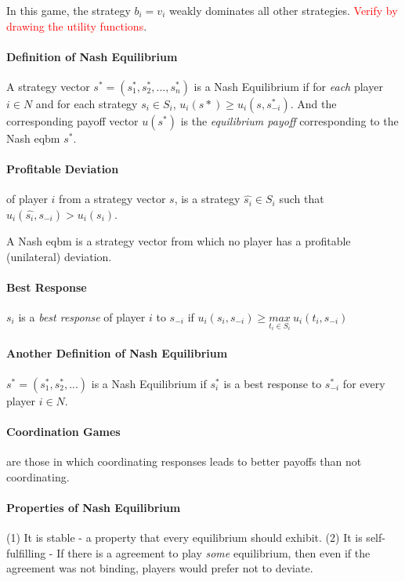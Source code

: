 In this game, the strategy $b_i = v_i$ weakly dominates all other strategies. \textcolor{red}{Verify by drawing the utility functions}.

\paragraph{Definition of Nash Equilibrium} A strategy vector $s^* = (s_1^*, s_2^*, ..., s_n^*)$ is a Nash Equilibrium if for \textit{each} player $i \in N$ and for each strategy $s_i \in S_i$, $u_i(s*) \geq u_i(s, s_{-i}^*)$. And the corresponding payoff vector $u(s^*)$ is the \textit{equilibrium payoff }corresponding to the Nash eqbm $s^*$.

\paragraph{Profitable Deviation} of player $i$ from a strategy vector $s$, is a strategy $\hat{s_i} \in S_i$ such that $u_i(\hat{s_i}, s_{-i}) > u_i(s_i)$.

A Nash eqbm is a strategy vector from which no player has a profitable (unilateral) deviation.

\paragraph{Best Response} $s_i$ is a \textit{best response} of player $i$ to $s_{-i}$ if $u_i(s_i, s_{-i}) \geq \underset{t_i \in S_i}{max}~u_i(t_i, s_{-i})$

\paragraph{Another Definition of Nash Equilibrium} $s^* = (s_1^*, s_2^*, ...)$ is a Nash Equilibrium if $s_i^*$ is a best response to $s_{-i}^*$ for every player $i \in N$.

\paragraph{Coordination Games} are those in which coordinating responses leads to better payoffs than not coordinating.

\paragraph{Properties of Nash Equilibrium} (1) It is stable - a property that every equilibrium should exhibit. (2) It is self-fulfilling - If there is a agreement to play \textit{some} equilibrium, then even if the agreement was not binding, players would prefer not to deviate. 
